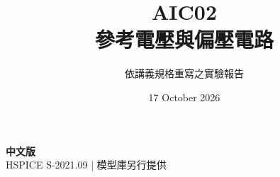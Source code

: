 \documentclass[11pt,a4paper]{article}
\title{\color{accent}AIC02\\[4pt]參考電壓與偏壓電路}
\author{依講義規格重寫之實驗報告}
\date{17 October 2026}
\begin{document}
\maketitle
\begin{center}\small\textbf{中文版}\\
HSPICE S-2021.09 \quad | \quad 模型庫另行提供
\end{center}


\end{document}
